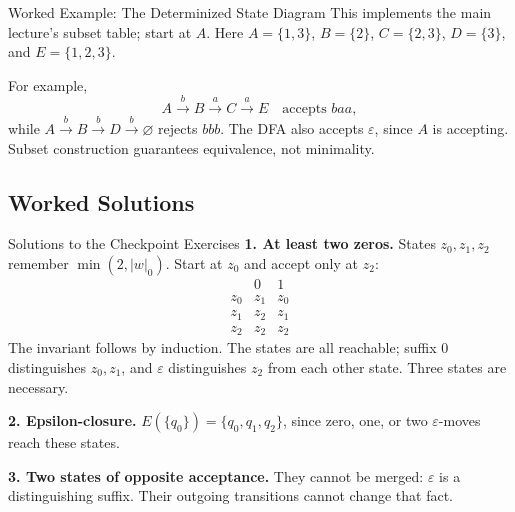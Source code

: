 \documentclass[10pt]{beamer}
\begin{document}
\begin{frame}[label=subset-diagram]{Worked Example: The Determinized State Diagram}
  \small
  This implements the main lecture's subset table; start at $A$.
  Here $A=\{1,3\}$, $B=\{2\}$, $C=\{2,3\}$, $D=\{3\}$,
  and $E=\{1,2,3\}$.
  \hyperlink{subset-table}{}
  \begin{center}
  \end{center}
  \pause
  For example,
  \[
    A\xrightarrow{b}B\xrightarrow{a}C\xrightarrow{a}E
    \quad\text{accepts }baa,
  \]
  while $A\xrightarrow{b}B\xrightarrow{b}D\xrightarrow{b}\varnothing$
  rejects $bbb$. The DFA also accepts $\varepsilon$, since $A$ is accepting.
  Subset construction guarantees equivalence, not minimality.
\end{frame}

\subsection{Worked Solutions}

\begin{frame}{Solutions to the Checkpoint Exercises}
  \small
  \textbf{1. At least two zeros.} States $z_0,z_1,z_2$ remember
  $\min(2,|w|_0)$. Start at $z_0$ and accept only at $z_2$:
  \[
    \begin{array}{c|cc}
       &0&1\\\hline
      z_0&z_1&z_0\\
      z_1&z_2&z_1\\
      z_2&z_2&z_2
    \end{array}
  \]
  The invariant follows by induction. The states are all reachable;
  suffix $0$ distinguishes $z_0,z_1$, and $\varepsilon$ distinguishes
  $z_2$ from each other state. Three states are necessary.
  \pause
  \par\smallskip
  \textbf{2. Epsilon-closure.} $E(\{q_0\})=\{q_0,q_1,q_2\}$, since
  zero, one, or two $\varepsilon$-moves reach these states.
  \pause
  \par\smallskip
  \textbf{3. Two states of opposite acceptance.} They cannot be merged:
  $\varepsilon$ is a distinguishing suffix. Their outgoing transitions
  cannot change that fact.
\end{frame}
\end{document}
